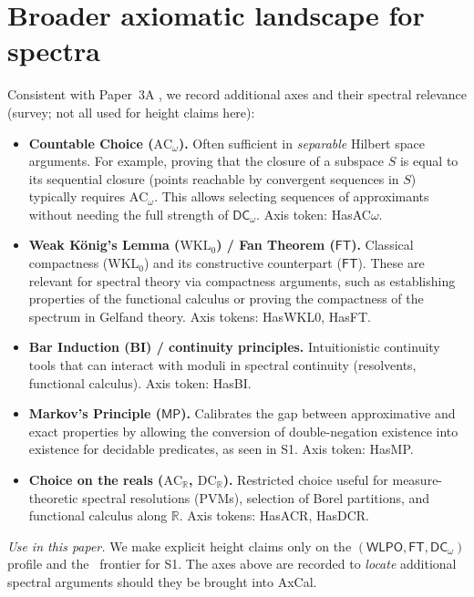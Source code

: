 \documentclass[11pt]{article}
\newcommand{\WLPO}{\mathsf{WLPO}}
\newcommand{\FT}{\mathsf{FT}}
\newcommand{\DCw}{\mathsf{DC}_{\omega}}
\newcommand{\MP}{\mathsf{MP}}
\theoremstyle{plain}
\theoremstyle{definition}
\theoremstyle{remark}
\newcommand{\R}{\mathbb{R}}
\newcommand{\ACw}{\mathrm{AC}_\omega}
\newcommand{\ACR}{\mathrm{AC}_{\mathbb{R}}}
\newcommand{\DCR}{\mathrm{DC}_{\mathbb{R}}}
\newcommand{\WKLz}{\mathrm{WKL}_0}
\begin{document}
\section{Broader axiomatic landscape for spectra}\label{sec:broad-axes}

Consistent with Paper~3A \cite{Paper3A}, we record additional axes and their spectral relevance (survey; not all used for height claims here):

\begin{itemize}
  \item \textbf{Countable Choice ($\ACw$).} Often sufficient in \emph{separable} Hilbert space arguments. For example, proving that the closure of a subspace $S$ is equal to its sequential closure (points reachable by convergent sequences in $S$) typically requires $\ACw$. This allows selecting sequences of approximants without needing the full strength of $\DCw$. Axis token: \textsf{HasAC$\omega$}.
  
  \item \textbf{Weak K\"onig's Lemma ($\WKLz$) / Fan Theorem ($\FT$).} Classical compactness ($\WKLz$) and its constructive counterpart ($\FT$). These are relevant for spectral theory via compactness arguments, such as establishing properties of the functional calculus or proving the compactness of the spectrum in Gelfand theory. Axis tokens: \textsf{HasWKL0}, \textsf{HasFT}.

  \item \textbf{Bar Induction (BI) / continuity principles.} Intuitionistic continuity tools that can interact with moduli in spectral continuity (resolvents, functional calculus). Axis token: \textsf{HasBI}.

  \item \textbf{Markov's Principle ($\MP$).} Calibrates the gap between approximative and exact properties by allowing the conversion of double-negation existence into existence for decidable predicates, as seen in S1. Axis token: \textsf{HasMP}.

  \item \textbf{Choice on the reals ($\ACR$, $\DCR$).} Restricted choice useful for measure-theoretic spectral resolutions (PVMs), selection of Borel partitions, and functional calculus along $\R$. Axis tokens: \textsf{HasACR}, \textsf{HasDCR}.
\end{itemize}

\noindent
\emph{Use in this paper.} We make explicit height claims only on the $(\WLPO,\FT,\DCw)$ profile and the \MP\ frontier for S1.
The axes above are recorded to \emph{locate} additional spectral arguments should they be brought into AxCal.
\end{document}
